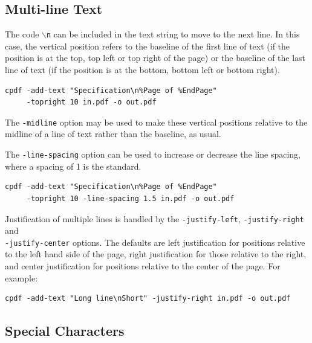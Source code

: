 \documentclass{book}
\begin{document}
\subsection{Multi-line Text}

The code \texttt{$\backslash$n} can be included in the text string to move to
the next line. In this case, the vertical position refers to the baseline of
the first line of text (if the position is at the top, top left or top right of
the page) or the baseline of the last line of text (if the position is at the
bottom, bottom left or bottom right).

  \begin{framed}
    \noindent\small\begin{verbatim}cpdf -add-text "Specification\n%Page of %EndPage"
     -topright 10 in.pdf -o out.pdf\end{verbatim}
  \end{framed}

\noindent The \texttt{-midline} option may be used to make these vertical positions
relative to the midline of a line of text rather than the baseline, as usual.

The \texttt{-line-spacing} option can be used to increase or decrease the line
spacing, where a spacing of 1 is the standard.

  \begin{framed}
    \noindent\small\begin{verbatim}cpdf -add-text "Specification\n%Page of %EndPage"
     -topright 10 -line-spacing 1.5 in.pdf -o out.pdf\end{verbatim}
  \end{framed}

\noindent Justification of multiple lines is handled by the \texttt{-justify-left}, 
\texttt{-justify-right} and\\ \texttt{-justify-center} options. The defaults are
left justification for positions relative to the left hand side of the page,
right justification for those relative to the right, and center justification
for positions relative to the center of the page. For example:

\begin{framed}
  \noindent\small\begin{verbatim}cpdf -add-text "Long line\nShort" -justify-right in.pdf -o out.pdf\end{verbatim}
\end{framed}

\subsection{Special Characters}
\end{document}
